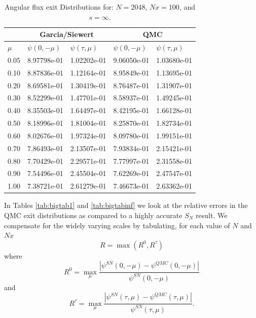\begin{table}[h]
\centering
\caption{Angular flux exit Distributions for: $N=2048$, $Nx=100$, and $s = \infty$.}
\label{tab:cesinf}
\begin{tabular}{lllll}
 & \multicolumn{2}{c}{Garcia/Siewert}
 & \multicolumn{2}{c}{QMC}\\
\hline
$\mu$ &$\psi(0, -\mu)$ &$\psi(\tau, \mu)$ &$\psi(0, -\mu)$ &$\psi(\tau, \mu)$ \\
\hline
0.05 &    8.97798e-01 &    1.02202e-01 &    9.06050e-01 &    1.03680e-01   \\ 
 0.10 &    8.87836e-01 &    1.12164e-01 &    8.95849e-01 &    1.13695e-01   \\ 
 0.20 &    8.69581e-01 &    1.30419e-01 &    8.76487e-01 &    1.31907e-01   \\ 
 0.30 &    8.52299e-01 &    1.47701e-01 &    8.58937e-01 &    1.49245e-01   \\ 
 0.40 &    8.35503e-01 &    1.64497e-01 &    8.42195e-01 &    1.66128e-01   \\ 
 0.50 &    8.18996e-01 &    1.81004e-01 &    8.25870e-01 &    1.82734e-01   \\ 
 0.60 &    8.02676e-01 &    1.97324e-01 &    8.09780e-01 &    1.99151e-01   \\ 
 0.70 &    7.86493e-01 &    2.13507e-01 &    7.93834e-01 &    2.15421e-01   \\ 
 0.80 &    7.70429e-01 &    2.29571e-01 &    7.77997e-01 &    2.31558e-01   \\ 
 0.90 &    7.54496e-01 &    2.45504e-01 &    7.62269e-01 &    2.47547e-01   \\ 
 1.00 &    7.38721e-01 &    2.61279e-01 &    7.46673e-01 &    2.63362e-01   \\ 
\hline
\end{tabular}
\end{table}

In Tables \ref{tab:bigtab1} and \ref{tab:bigtabinf} we look at the relative errors in the QMC exit distributions as compared to a highly accurate $S_N$ result. We compensate for the widely varying scales by tabulating, for each value of $N$ and $Nx$
\[
R = \max(R^0, R^\tau)
\]
where
\[
R^0 = \max_\mu
\frac{ | \psi^{SN}(0,-\mu) - \psi^{QMC}(0,-\mu) | }{\psi^{SN}(0,-\mu) }
\]
and
\[
R^\tau = \max_\mu
\frac{ | \psi^{SN}(\tau,\mu) - \psi^{QMC}(\tau,\mu) | }{\psi^{SN}(\tau,\mu) }.
\]

